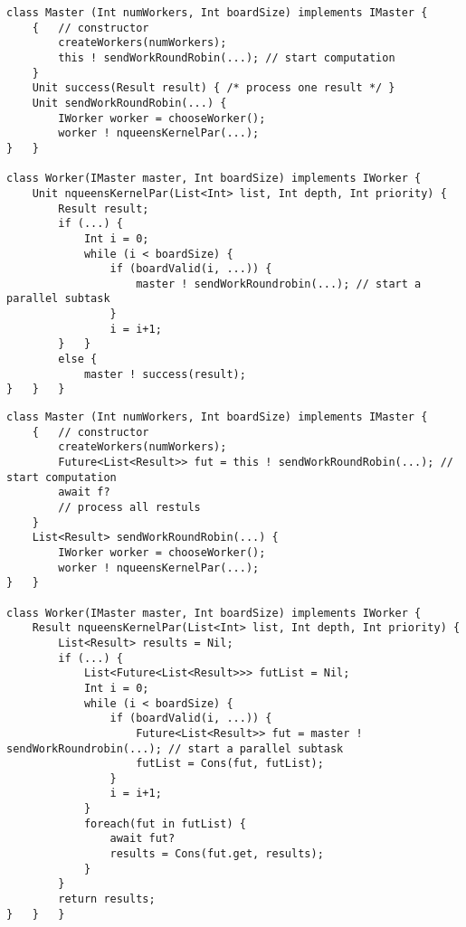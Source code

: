 \begin{lstlisting}[caption=NQueens without cooperative scheduling , label=absex]
class Master (Int numWorkers, Int boardSize) implements IMaster {
	{   // constructor
		createWorkers(numWorkers);
		this ! sendWorkRoundRobin(...); // start computation
	}
	Unit success(Result result) { /* process one result */ }
	Unit sendWorkRoundRobin(...) {
		IWorker worker = chooseWorker();
		worker ! nqueensKernelPar(...);
}	}

class Worker(IMaster master, Int boardSize) implements IWorker {
	Unit nqueensKernelPar(List<Int> list, Int depth, Int priority) {
		Result result;
		if (...) { 
    		Int i = 0;
			while (i < boardSize) {
				if (boardValid(i, ...)) {
					master ! sendWorkRoundrobin(...); // start a parallel subtask
				}
				i = i+1;
		}	}
		else {
			master ! success(result);
}	}	}
\end{lstlisting}


\begin{lstlisting}[caption=NQueens  with cooperative scheduling , label=absex]
class Master (Int numWorkers, Int boardSize) implements IMaster {
	{   // constructor
		createWorkers(numWorkers);
		Future<List<Result>> fut = this ! sendWorkRoundRobin(...); // start computation
		await f?
		// process all restuls
	}
	List<Result> sendWorkRoundRobin(...) {
		IWorker worker = chooseWorker();
		worker ! nqueensKernelPar(...);
}	}

class Worker(IMaster master, Int boardSize) implements IWorker {
	Result nqueensKernelPar(List<Int> list, Int depth, Int priority) {
		List<Result> results = Nil;
		if (...) { 
			List<Future<List<Result>>> futList = Nil;
    		Int i = 0;
			while (i < boardSize) {
				if (boardValid(i, ...)) {
					Future<List<Result>> fut = master ! sendWorkRoundrobin(...); // start a parallel subtask
					futList = Cons(fut, futList);
				}
				i = i+1;
			}
			foreach(fut in futList) {
				await fut?
				results = Cons(fut.get, results);
			}
		}
		return results;
}	}	}
\end{lstlisting}


